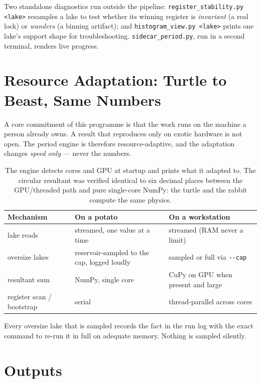 \documentclass[11pt, letterpaper, openany]{book}
\begin{document}
Two standalone diagnostics run outside the pipeline:
\texttt{register\_stability.py <lake>} resamples a lake to test whether its winning register is
\emph{invariant} (a real lock) or \emph{wanders} (a binning artifact); and
\texttt{histogram\_view.py <lake>} prints one lake's support shape for troubleshooting.
\texttt{sidecar\_period.py}, run in a second terminal, renders live progress.

\section{Resource Adaptation: Turtle to Beast, Same Numbers}

A core commitment of this programme is that the work runs on the machine a person already owns. A
result that reproduces only on exotic hardware is not open. The period engine is therefore
resource-adaptive, and the adaptation changes \emph{speed only} --- never the numbers.

\begin{table}[H]
\centering
\small
\begin{tabular}{@{}lll@{}}
\toprule
\textbf{Mechanism} & \textbf{On a potato} & \textbf{On a workstation} \\
\midrule
lake reads & streamed, one value at a time & streamed (RAM never a limit) \\
oversize lakes & reservoir-sampled to the cap, logged loudly & sampled or full via \texttt{-{}-cap} \\
resultant sum & NumPy, single core & CuPy on GPU when present and large \\
register scan / bootstrap & serial & thread-parallel across cores \\
\bottomrule
\end{tabular}
\caption{The engine detects cores and GPU at startup and prints what it adapted to. The circular
resultant was verified identical to six decimal places between the GPU/threaded path and pure
single-core NumPy: the turtle and the rabbit compute the same physics.}
\end{table}

Every oversize lake that is sampled records the fact in the run log with the exact command to
re-run it in full on adequate memory. Nothing is sampled silently.

\section{Outputs}
\end{document}
